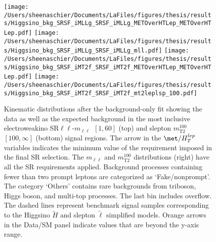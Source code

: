  \begin{figure}%
  \begin{center}
   \texttt{[image: /Users/sheenaschier/Documents/LaFiles/figures/thesis/results/Higgsino\_bkg\_SRSF\_iMLLg\_SRSF\_iMLLg\_METOverHTLep\_METOverHTLep.pdf]}
   \texttt{[image: /Users/sheenaschier/Documents/LaFiles/figures/thesis/results/Higgsino\_bkg\_SRSF\_iMLLg\_SRSF\_iMLLg\_mll.pdf]}
   \texttt{[image: /Users/sheenaschier/Documents/LaFiles/figures/thesis/results/Higgsino\_bkg\_SRSF\_iMT2f\_SRSF\_iMT2f\_METOverHTLep\_METOverHTLep.pdf]}
   \texttt{[image: /Users/sheenaschier/Documents/LaFiles/figures/thesis/results/Higgsino\_bkg\_SRSF\_iMT2f\_SRSF\_iMT2f\_mt2leplsp\_100.pdf]}
   \end{center}
 \caption{Kinematic distributions after the background-only fit showing the data as well as the expected background in the most inclusive electroweakino SR$\ell\ell$-$m_{\ell\ell}$~$[1, 60]$ (top) and slepton $m_\text{T2}^{100}$~$[100, \infty]$ (bottom) signal regions. The arrow in the $\met/H_{T}^{lep}$ variables indicates the minimum value of the requirement imposed in the final SR selection. The $m_{\ell\ell}$ and $m_\text{T2}^{100}$ distributions (right) have all the SR requirements applied. Background processes containing fewer than two prompt leptons are categorized as `Fake/nonprompt'. The category `Others' contains rare backgrounds from triboson, Higgs boson, and multi-top processes.  The last bin includes overflow. The dashed lines represent benchmark signal samples corresponding to the Higgsino $\widetilde{H}$ and slepton $\tilde\ell$ simplified models. Orange arrows in the Data/SM panel indicate values that are beyond the y-axis range.}
  \label{fig:SRpostfitplots}
 \end{figure}


